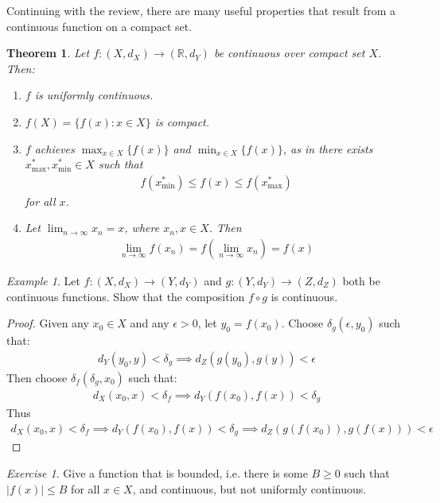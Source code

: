 \documentclass[11pt]{article}
\newcommand{\R}{\ensuremath{\mathbb R}}
\newcommand{\e}{\epsilon}
\theoremstyle{plain}
\newtheorem{thm}{Theorem}[section]
\theoremstyle{definition}
\theoremstyle{remark}
\newtheorem{exm}{Example}[section]
\newtheorem{exc}{Exercise}[section]
\begin{document}
Continuing with the review, there are many useful properties that result from a continuous function on a compact set.
\begin{thm}
    Let $f: (X,d_X) \rightarrow (\R, d_Y)$ be continuous over compact set $X$. Then:
    \begin{enumerate}
        \item $f$ is uniformly continuous.
        \item $f(X) = \{f(x) : x \in X\}$ is compact. 
        \item $f$ achieves $\max_{x \in X} \{f(x)\}$ and $\min_{x \in X} \{f(x)\}$, as in there exists $x^*_{\text{max}}, x^*_{\text{min}} \in X$ such that
        \begin{align*}
            f(x^*_{\text{min}}) \leq f(x) \leq f(x^*_{\text{max}})
        \end{align*}
        for all $x$.
        \item Let $\lim_{n \rightarrow \infty} x_n = x$, where $x_n, x \in X$. Then
        \begin{align*}
            \lim_{n \rightarrow \infty} f(x_n) = f\left(\lim_{n \rightarrow \infty} x_n\right) = f(x)
        \end{align*}
    \end{enumerate}
\end{thm}
\begin{exm}
    Let $f: (X,d_X) \rightarrow (Y, d_Y)$ and $g: (Y,d_Y) \rightarrow (Z, d_Z)$ both be continuous functions. Show that the composition $f \circ g$ is continuous.
    \begin{proof}
        Given any $x_0 \in X$ and any $\e > 0$, let $y_0 = f(x_0)$. Choose $\delta_g(\e, y_0)$ such that:
        \begin{align*}
            d_Y(y_0,y) < \delta_g \implies d_Z(g(y_0), g(y)) < \e
        \end{align*}
        Then choose $\delta_f(\delta_g, x_0)$ such that:
        \begin{align*}
            d_X(x_0,x) < \delta_f \implies d_Y(f(x_0),f(x)) < \delta_g
        \end{align*}
        Thus
        \begin{align*}
             d_X(x_0,x) < \delta_f \implies d_Y(f(x_0),f(x)) < \delta_g \implies d_Z(g(f(x_0)), g(f(x))) < \e
        \end{align*}
    \end{proof}
\end{exm}
\begin{exc}
    Give a function that is bounded, i.e. there is some $B \geq 0$ such that $|f(x)| \leq B$ for all $x \in X$, and continuous, but not uniformly continuous.
\end{exc}
\end{document}
